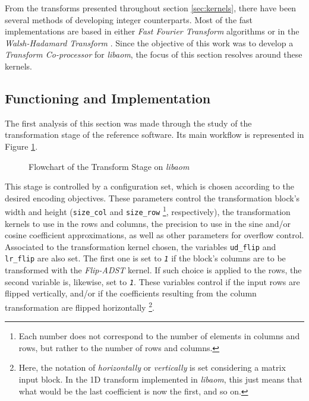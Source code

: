 From the transforms presented throughout section \ref{sec:kernels}, there have been several methods of developing integer counterparts. Most of the fast implementations are based in either \emph{Fast Fourier Transform} algorithms or in the \emph{Walsh-Hadamard Transform} \cite{wolterParallelArchitecturesDiscrete1992,yonghongzengIntegerDCTsFast2001}. Since the objective of this work was to develop a \emph{Transform Co-processor} for \emph{libaom}, the focus of this section resolves around these kernels. 

\subsection{Functioning and Implementation}

The first analysis of this section was made through the study of the transformation stage of the reference software. Its main workflow is represented in Figure \ref{fig:libtrans}.

\begin{figure}[!htbp]
    \centering
    
    \caption{Flowchart of the Transform Stage on \emph{libaom}}
    \label{fig:libtrans}
\end{figure}

This stage is controlled by a configuration set, which is chosen according to the desired encoding objectives. These parameters control the transformation block's width and height (\texttt{size\_col} and \texttt{size\_row} \footnote{Each number does not correspond to the number of elements in columns and rows, but rather to the number of rows and columns.}, respectively), the transformation kernels to use in the rows and columns, the precision to use in the sine and/or cosine coefficient approximations, as well as other parameters for overflow control. Associated to the transformation kernel chosen, the variables \texttt{ud\_flip} and \texttt{lr\_flip} are also set. The first one is set to \emph{\texttt{1}} if the block's columns are to be transformed with the \emph{Flip-ADST} kernel. If such choice is applied to the rows, the second variable is, likewise, set to \emph{\texttt{1}}. These variables control if the input rows are flipped vertically, and/or if the coefficients resulting from the column transformation are flipped horizontally \footnote{Here, the notation of \emph{horizontally} or \emph{vertically} is set considering a matrix input block. In the 1D transform implemented in \emph{libaom}, this just means that what would be the last coefficient is now the first, and so on.}.

